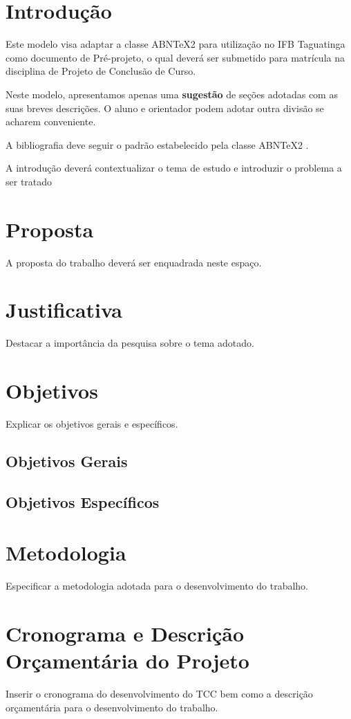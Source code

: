 \documentclass[licenciatura]{pre-projeto-computacao}
\begin{document}
\frenchspacing 
\imprimircapa
\imprimirfolhaderosto



\section*{Introdução}
	Este modelo visa adaptar a classe ABNTeX2 para utilização no IFB Taguatinga como documento de Pré-projeto, o qual deverá ser submetido para matrícula na disciplina de Projeto de Conclusão de Curso.
	
	Neste modelo, apresentamos apenas uma \textbf{sugestão} de seções adotadas com as suas breves descrições. O aluno e orientador podem adotar outra divisão se acharem conveniente.
	
	A bibliografia deve seguir o padrão estabelecido pela classe ABNTeX2 \cite{abntex2modelo-relatorio}.
	
	A introdução deverá contextualizar o tema de estudo e introduzir o problema a ser tratado

\section*{Proposta}
	A proposta do trabalho deverá ser enquadrada neste espaço.

\section*{Justificativa}
	Destacar a importância da pesquisa sobre o tema adotado.	

\section*{Objetivos}
	Explicar os objetivos gerais e específicos.
\subsection*{Objetivos Gerais}
\subsection*{Objetivos Específicos}

\section*{Metodologia}
	Especificar a metodologia adotada para o desenvolvimento do trabalho.

\section*{Cronograma e Descrição Orçamentária do Projeto}
	Inserir o cronograma do desenvolvimento do TCC bem como a descrição orçamentária para o desenvolvimento do trabalho.


\end{document}
